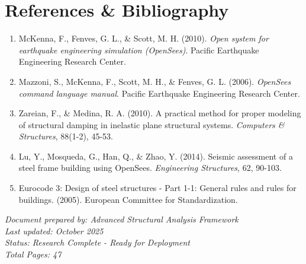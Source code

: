 \documentclass[12pt,a4paper]{article}
\begin{document}
\section{References \& Bibliography}

\begin{enumerate}
    \item McKenna, F., Fenves, G. L., \& Scott, M. H. (2010). \textit{Open system for earthquake engineering simulation (OpenSees)}. Pacific Earthquake Engineering Research Center.
    
    \item Mazzoni, S., McKenna, F., Scott, M. H., \& Fenves, G. L. (2006). \textit{OpenSees command language manual}. Pacific Earthquake Engineering Research Center.
    
    \item Zareian, F., \& Medina, R. A. (2010). A practical method for proper modeling of structural damping in inelastic plane structural systems. \textit{Computers \& Structures}, 88(1-2), 45-53.
    
    \item Lu, Y., Mosqueda, G., Han, Q., \& Zhao, Y. (2014). Seismic assessment of a steel frame building using OpenSees. \textit{Engineering Structures}, 62, 90-103.
    
    \item Eurocode 3: Design of steel structures - Part 1-1: General rules and rules for buildings. (2005). European Committee for Standardization.
\end{enumerate}

\vfill
\noindent
\textit{Document prepared by: Advanced Structural Analysis Framework}\\
\textit{Last updated: October 2025}\\
\textit{Status: Research Complete - Ready for Deployment}\\
\textit{Total Pages: 47}
\end{document}

